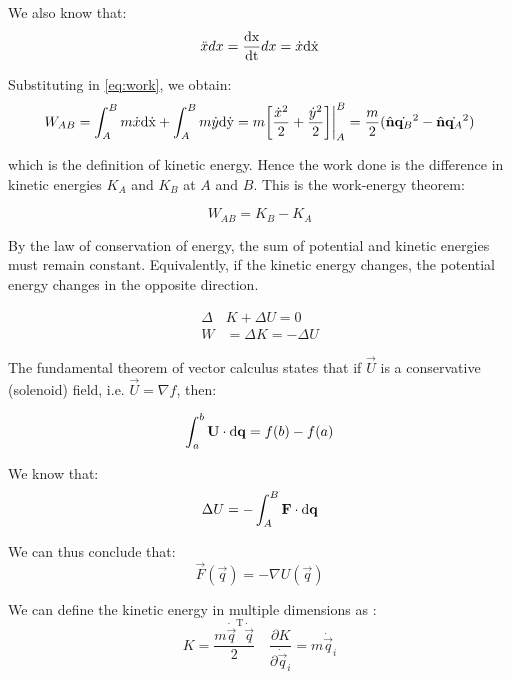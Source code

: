 \documentclass{article}
\newcommand{\bm}[1]{\mathbf{#1}}
\newcommand{\norm}{\hat{\bm{n}}}
\begin{document}
We also know that:
\begin{equation}
    \ddot{x} dx = \frac{\mathrm{dx}}{\mathrm{dt}} dx = \dot{x} \mathrm{d\dot{x}}
\end{equation}

Substituting in \autoref{eq:work}, we obtain:
\begin{equation}
    W_{AB} = \int_A^B m \dot{x} \d{\dot{x}} + \int_A^B m \dot{y} \d{\dot{y}} = m \bigg[ \frac{\dot{x}^2}{2} + \frac{\dot{y}^2}{2}  \bigg] \bigg|_A^B = \frac{m}{2} ( \norm{\dot{\vec{q}_B}}^2 - \norm{\dot{\vec{q}_A}}^2 )
\end{equation}

which is the definition of kinetic energy. Hence the work done is the difference in kinetic energies $K_A$ and $K_B$ at $A$ and $B$. This is the work-energy theorem:

\begin{equation}
    W_{AB} = K_B - K_A
\end{equation}

By the law of conservation of energy, the sum of potential and kinetic energies must remain constant. Equivalently, if the kinetic energy changes, the potential energy changes in the opposite direction.

\begin{align*}
    \Delta& K + \Delta U = 0 \\
    W &= \Delta K = - \Delta U
\end{align*}

The fundamental theorem of vector calculus states that if $\vec{U}$ is a conservative (solenoid) field, i.e. $\vec{U} = \nabla f$, then:

\begin{equation}
    \int_a^b \mathbf{U} \cdot \mathrm{d\mathbf{q}} = f(b) - f(a)
\end{equation}

We know that:
\begin{equation*}
    \Delta U = - \int_A^B \mathbf{F} \cdot \mathrm{d\mathbf{q}}
\end{equation*}

We can thus conclude that:
\begin{equation} \label{eq:fuckme}
    \vec{F}(\vec{q}) = -\nabla U (\vec{q})
\end{equation}

We can define the kinetic energy in multiple dimensions as :
\begin{equation} \label{eq:partialK}
    K = \frac{m \dot{\vec{q}}^\text{T} \dot{\vec{q}}}{2} \quad
        \frac{\partial K}{\partial\dot{\vec{q}}_i} = m \dot{\vec{q}}_i
\end{equation}
\end{document}
